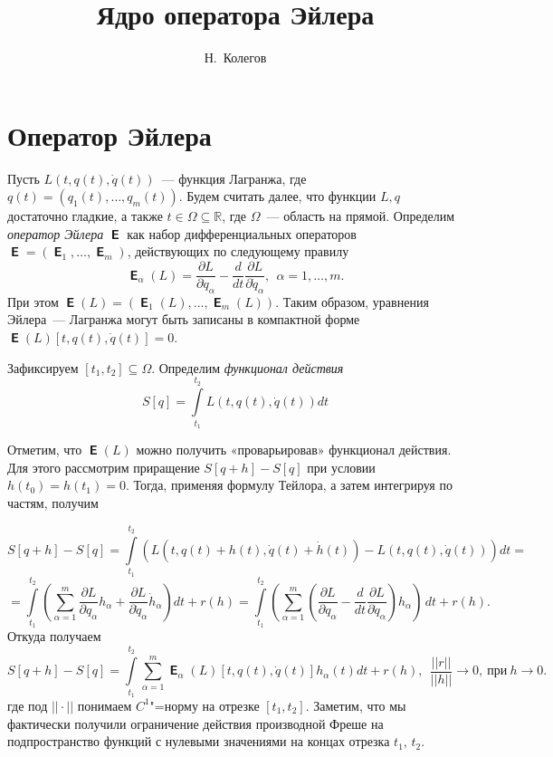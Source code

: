 \documentclass[11pt,a4paper]{article}
\theoremstyle{definition}
\numberwithin{equation}{section}
\def\R{{\mathbb R}}
\begin{document}
\author{Н.~Колегов}
\title{Ядро оператора Эйлера}
\maketitle
\section{Оператор Эйлера}
Пусть $L(t,q(t),\dot{q}(t))$~— функция Лагранжа, где $q(t)=(q_1(t),\ldots,
q_m(t))$. Будем считать далее, что функции $L,q$ достаточно гладкие, а также
$t\in\Omega\subseteq\R$, где $\Omega$~— область на прямой. Определим {\em
оператор Эйлера} $\mbfsansE$ как набор дифференциальных операторов $\mbfsansE=(\mbfsansE_1,\ldots,
\mbfsansE_m)$, действующих по следующему правилу
$$\mbfsansE_\alpha(L)=\dfrac{\partial L}{\partial q_\alpha}-\dfrac{d}{dt}\dfrac{\partial L}{\partial\dot{q}_\alpha},~~\alpha=1,\ldots,m.$$
При этом $\mbfsansE(L)=(\mbfsansE_1(L),\ldots,\mbfsansE_m(L))$. Таким образом, уравнения Эйлера~— Лагранжа могут быть записаны в компактной форме $\mbfsansE(L)[t,q(t),\dot{q}(t)]=0$.

Зафиксируем $[t_1,t_2]\subseteq\Omega$. Определим {\em функционал действия}
\begin{equation} \label{eq1}
S[q]=\int\limits_{t_1}^{t_2} L(t,q(t),\dot{q}(t))dt
\end{equation}


Отметим, что $\mbfsansE(L)$ можно получить «проварьировав» функционал действия. Для этого рассмотрим приращение $S[q+h]-S[q]$ при условии $h(t_0)=h(t_1)=0$. Тогда, применяя формулу Тейлора, а затем интегрируя по частям, получим

$$S[q+h]-S[q]=\int\limits_{t_1}^{t_2}\left( L(t,q(t)+h(t),\dot{q}(t)+\dot{h}(t))-L(t,q(t),\dot{q}(t))\right) dt= $$
$$=\int\limits_{t_1}^{t_2}\left( \sum\limits_{\alpha=1}^m\dfrac{\partial L}{\partial q_\alpha}h_\alpha+\dfrac{\partial L}{\partial\dot{q}_\alpha}\dot{h}_\alpha\right) dt +r(h)=\int\limits_{t_1}^{t_2}\left(\sum\limits_{\alpha=1}^m\left( \dfrac{\partial L}{\partial q_\alpha}-\dfrac{d}{dt}\dfrac{\partial L}{\partial\dot{q}_\alpha}\right)h_\alpha\right)\,dt+r(h).$$
Откуда получаем
\begin{equation}\label{eq2}
S[q+h]-S[q]=\int\limits_{t_1}^{t_2}\sum\limits_{\alpha=1}^m \mbfsansE_\alpha(L)[t,q(t),\dot{q}(t)]h_\alpha(t)dt +r(h),~~\dfrac{||r||}{||h||}\rightarrow 0, ~\text{при}~h\rightarrow 0.
\end{equation}
где под $||\cdot||$ понимаем $C^1$"=норму на отрезке $[t_1,t_2]$.
Заметим, что мы фактически получили ограничение действия производной Фреше на подпространство функций с нулевыми значениями на концах отрезка $t_1$, $t_2$.
\end{document}
